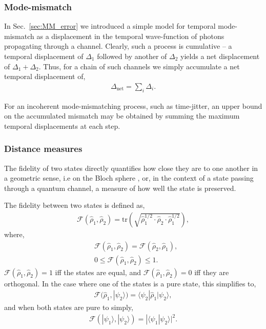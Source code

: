 \documentclass[aps, rmp, twocolumn, amsmath, amssymb, nofootinbib, superscriptaddress, longbibliography, floatfix, table-of-contents, eqsecnum]{revtex4-1}
\newcommand{\bra}[1]{\langle#1|}
\newcommand{\ket}[1]{|#1\rangle}
\begin{document}
%
%

\subsubsection{Mode-mismatch} 

In Sec.~\ref{sec:MM_error} we introduced a simple model for temporal mode-mismatch as a displacement in the temporal wave-function of photons propagating through a channel. Clearly, such a process is cumulative -- a temporal displacement of $\Delta_1$ followed by another of $\Delta_2$ yields a net displacement of \mbox{$\Delta_1+\Delta_2$}. Thus, for a chain of such channels we simply accumulate a net temporal displacement of,
\begin{align}
\Delta_\text{net} = \sum_i \Delta_i.
\end{align}

For an incoherent mode-mismatching process, such as time-jitter, an upper bound on the accumulated mismatch may be obtained by summing the maximum temporal displacements at each step.

%
%

\subsubsection{Distance measures} \label{sec:fid_metric} 

The fidelity of two states directly quantifies how close they are to one another in a geometric sense, i.e on the Bloch sphere \cite{???}, or, in the context of a state passing through a quantum channel, a measure of how well the state is preserved.

The fidelity between two states is defined as,
\begin{align}
\mathcal{F}(\hat\rho_1,\hat\rho_2) = \text{tr}\left(\sqrt{\hat\rho_1^{1/2}\cdot\hat\rho_2\cdot\hat\rho_1^{1/2}}\right),
\end{align}
where,
\begin{align}
& \mathcal{F}(\hat\rho_1,\hat\rho_2) = \mathcal{F}(\hat\rho_2,\hat\rho_1), \nonumber \\
& 0\leq \mathcal{F}(\hat\rho_1,\hat\rho_2) \leq 1.
\end{align}
\mbox{$\mathcal{F}(\hat\rho_1,\hat\rho_2)=1$} iff the states are equal, and \mbox{$\mathcal{F}(\hat\rho_1,\hat\rho_2)=0$} iff they are orthogonal.
In the case where one of the states is a pure state, this simplifies to,
\begin{align}
\mathcal{F}(\hat\rho_1,\ket{\psi_2}) = \bra{\psi_2}\hat\rho_1\ket{\psi_2},
\end{align}
and when both states are pure to simply,
\begin{align}
\mathcal{F}(\ket{\psi_1},\ket{\psi_2}) = |\langle\psi_1 | \psi_2\rangle|^2.
\end{align}
\end{document}
